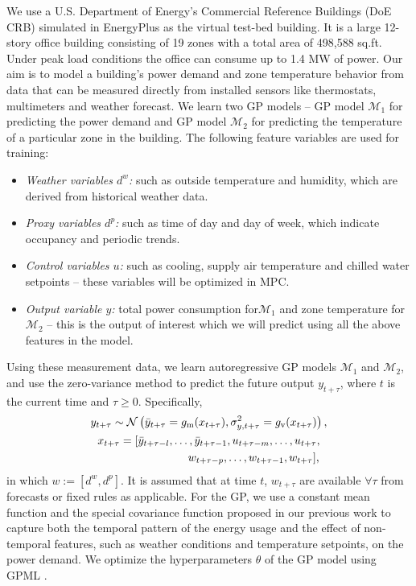 We use a U.S. Department of Energy’s Commercial Reference Buildings (DoE CRB) simulated in EnergyPlus as the virtual test-bed building. It is a large 12-story office building consisting of 19 zones with a total area of 498,588 sq.ft. Under peak load conditions the office can consume up to 1.4 MW of power.
Our aim is to model a building's power demand and zone temperature behavior from data that can be measured directly from installed sensors like thermostats, multimeters and weather forecast.
We learn two GP models -- GP model \(\mathcal{M}_1\) for predicting the power demand and GP model \(\mathcal{M}_2\) for predicting the temperature of a particular zone in the building.
The following feature variables are used for training:
\begin{itemize}
\item \textit{Weather variables \(d^w\):} such as outside temperature and humidity, which are derived from historical weather data.
\item \textit{Proxy variables \(d^p\):} such as time of day and day of week, which indicate occupancy and periodic trends.
\item \textit{Control variables \(u\):} such as cooling, supply air temperature and chilled water setpoints -- these variables will be optimized in MPC.
\item \textit{Output variable \(y\):} total power consumption for\(\mathcal{M}_1\) and zone temperature for \(\mathcal{M}_2\) -- this is the output of interest which we will predict using all the above features in the model.
\end{itemize}

Using these measurement data, we learn autoregressive GP models \(\mathcal{M}_1\) and \(\mathcal{M}_2\), and use the zero-variance method to predict the future output \(y_{t+\tau}\), where $t$ is the current time and \( \tau \ge 0\).
Specifically,
\begin{gather}
\label{eq:dpc:prediction}
y_{t+\tau} \sim \operatorname*{\mathcal{N}}\left(\bar{y}_{t+\tau} = g_{\mathrm m}(x_{t+\tau}), \sigma^2_{y, t+\tau} = g_{\mathrm v}(x_{t+\tau})\right), \\
x_{t + \tau} = [\bar y_{t+ \tau-l}, \dots, \bar y_{t+ \tau-1}, u_{t+ \tau-m}, \dots, u_{t+ \tau}, \nonumber \\
\qquad\qquad\qquad\qquad  w_{t+ \tau-p}, \dots, w_{t+ \tau-1}, w_{t+ \tau}]\text, \nonumber
\end{gather}
in which \(w:=[d^w, d^p]\).
It is assumed that at time \(t\), \(w_{t+\tau}\) are available \(\forall \tau \) from forecasts or fixed rules as applicable.
For the GP, we use a constant mean function and the special covariance function proposed in our previous work \cite{nghiemetal16gp} to capture both the temporal pattern of the energy usage and the effect of non-temporal features, such as weather conditions and temperature setpoints, on the power demand.
We optimize the hyperparameters \(\theta\) %
of the GP model using GPML \cite{Rasmussen2010}.

